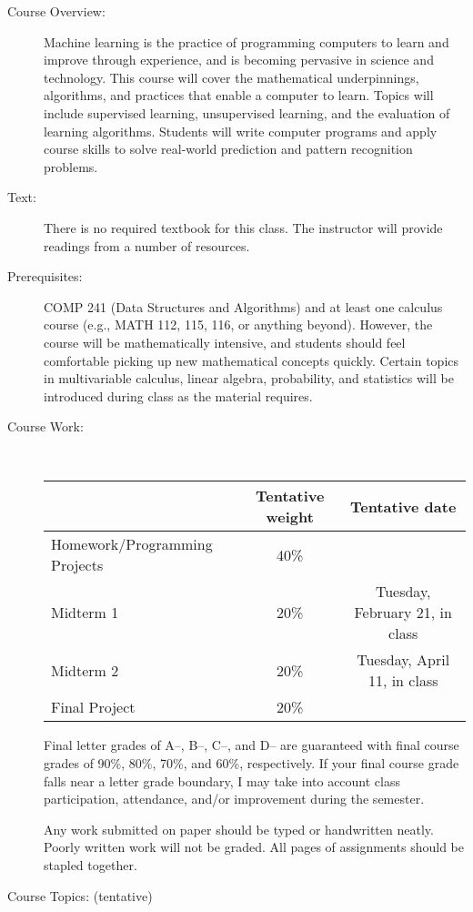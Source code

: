 \documentclass [letterpaper,11pt]{article}
\begin{document}
\begin{description}
\item[Course Overview:] Machine learning is the practice of programming computers to learn and improve through experience, and is becoming pervasive in science and technology. This course will cover the mathematical underpinnings, algorithms, and practices that enable a computer to learn. Topics will include supervised learning, unsupervised learning, and the evaluation of learning algorithms. Students will write computer programs and apply course skills to solve real-world prediction and pattern recognition problems.

\item[Text:] There is no required textbook for this class.  The instructor will provide readings from a number of resources.

\item[Prerequisites:] COMP 241 (Data Structures and Algorithms) and at least one calculus course (e.g., MATH 112, 115, 116, or anything beyond).  However, the course will be mathematically intensive, and students should feel comfortable picking up new mathematical concepts quickly.  Certain topics in multivariable calculus, linear algebra, probability, and statistics will be introduced during class as the material requires.  

\item[Course Work:] \

\begin{tabular}{lcc} 
& Tentative weight & Tentative date \\ \hline
Homework/Programming Projects & 40\% & \\
Midterm 1 & 20\% & Tuesday, February 21, in class\\
Midterm 2 & 20\% & Tuesday, April 11, in class\\
Final Project & 20\% & \\
\end{tabular}

Final letter grades of A--, B--, C--, and D-- are guaranteed with final course grades of 90\%, 80\%,
70\%, and 60\%, respectively.
If your final course grade falls near a letter grade boundary,
I may take into account class participation, attendance, and/or improvement during the semester.

Any work submitted on paper should be typed or handwritten neatly. Poorly written work will not be graded. All pages of assignments should be stapled together.

\item[Course Topics: (tentative)]\


\end{description}
\end{document}
